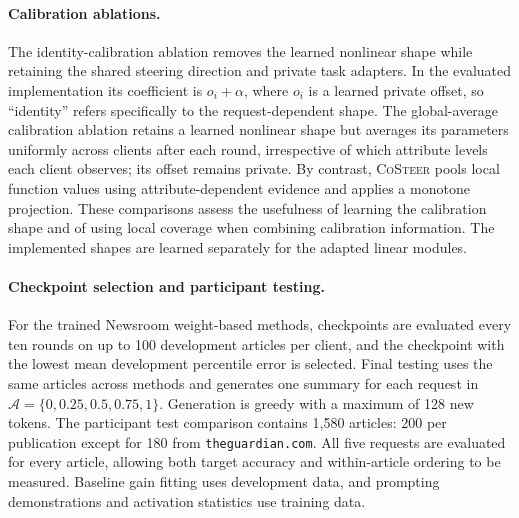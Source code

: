 \documentclass[11pt]{article}
\newcommand{\costeer}{\textsc{CoSteer}}
\begin{document}
\paragraph{Calibration ablations.}
The identity-calibration ablation removes the learned nonlinear shape while retaining the shared steering direction and private task adapters. In the evaluated implementation its coefficient is $o_i+\alpha$, where $o_i$ is a learned private offset, so ``identity'' refers specifically to the request-dependent shape. The global-average calibration ablation retains a learned nonlinear shape but averages its parameters uniformly across clients after each round, irrespective of which attribute levels each client observes; its offset remains private. By contrast, \costeer{} pools local function values using attribute-dependent evidence and applies a monotone projection. These comparisons assess the usefulness of learning the calibration shape and of using local coverage when combining calibration information. The implemented shapes are learned separately for the adapted linear modules.

\paragraph{Checkpoint selection and participant testing.}
For the trained Newsroom weight-based methods, checkpoints are evaluated every ten rounds on up to 100 development articles per client, and the checkpoint with the lowest mean development percentile error is selected. Final testing uses the same articles across methods and generates one summary for each request in $\mathcal A=\{0,0.25,0.5,0.75,1\}$. Generation is greedy with a maximum of 128 new tokens. The participant test comparison contains 1,580 articles: 200 per publication except for 180 from \texttt{theguardian.com}. All five requests are evaluated for every article, allowing both target accuracy and within-article ordering to be measured. Baseline gain fitting uses development data, and prompting demonstrations and activation statistics use training data.
\end{document}
